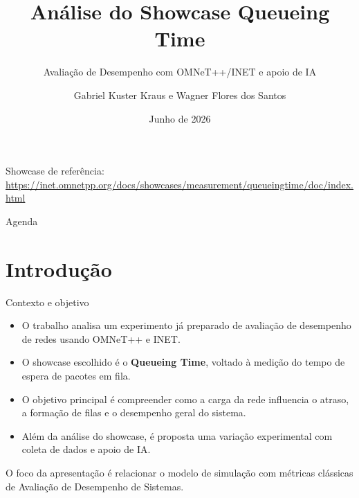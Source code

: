 \documentclass[aspectratio=169]{beamer}
\title{Análise do Showcase Queueing Time}
\subtitle{Avaliação de Desempenho com OMNeT++/INET e apoio de IA}
\author{Gabriel Kuster Kraus e Wagner Flores dos Santos}
\institute{ADS29009 -- Avaliação de Desempenho de Sistemas \\ Engenharia de Telecomunicações}
\date{Junho de 2026}
\begin{document}
\begin{frame}
    \maketitle

    \vspace{0.5cm}
    \centering
    \small
    Showcase de referência: \\
    \url{https://inet.omnetpp.org/docs/showcases/measurement/queueingtime/doc/index.html}
\end{frame}

\begin{frame}{Agenda}
  \tableofcontents
\end{frame}

\section{Introdução}

\begin{frame}{Contexto e objetivo}
\begin{itemize}
    \item O trabalho analisa um experimento já preparado de avaliação de desempenho de redes usando OMNeT++ e INET.
    \item O showcase escolhido é o \textbf{Queueing Time}, voltado à medição do tempo de espera de pacotes em fila.
    \item O objetivo principal é compreender como a carga da rede influencia o atraso, a formação de filas e o desempenho geral do sistema.
    \item Além da análise do showcase, é proposta uma variação experimental com coleta de dados e apoio de IA.
\end{itemize}

\begin{informacao}
O foco da apresentação é relacionar o modelo de simulação com métricas clássicas de Avaliação de Desempenho de Sistemas.
\end{informacao}
\end{frame}
\end{document}
